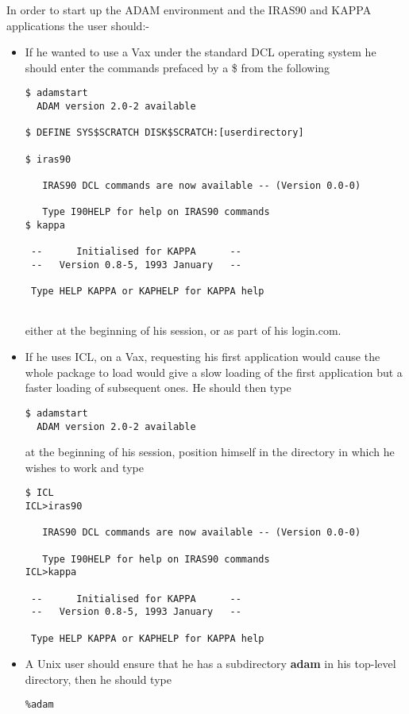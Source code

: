 In order to start up the ADAM environment and the IRAS90 and KAPPA applications
the user should:-
\begin{itemize}
\item If he wanted to use a Vax under the standard DCL operating system  he 
should enter the commands prefaced by a \$ from the following
\begin{small}
\begin{verbatim}
$ adamstart
  ADAM version 2.0-2 available

$ DEFINE SYS$SCRATCH DISK$SCRATCH:[userdirectory]

$ iras90
 
   IRAS90 DCL commands are now available -- (Version 0.0-0)
 
   Type I90HELP for help on IRAS90 commands
$ kappa
 
 --      Initialised for KAPPA      -- 
 --   Version 0.8-5, 1993 January   -- 
 
 Type HELP KAPPA or KAPHELP for KAPPA help   
 
\end{verbatim}
\end{small}
either at the beginning of his session, or as part of his login.com.
\item If he uses ICL, on a Vax, requesting his first application would cause the
whole package to load would give a slow loading of the first application but a
faster loading of subsequent ones. He should then type
\begin{small}
\begin{verbatim}
$ adamstart
  ADAM version 2.0-2 available
\end{verbatim}
\end{small}
at the beginning of his session, position himself in the directory in which he 
wishes to work and type
\begin{small}
\begin{verbatim}
$ ICL
ICL>iras90
 
   IRAS90 DCL commands are now available -- (Version 0.0-0)
 
   Type I90HELP for help on IRAS90 commands
ICL>kappa
 
 --      Initialised for KAPPA      -- 
 --   Version 0.8-5, 1993 January   -- 
 
 Type HELP KAPPA or KAPHELP for KAPPA help   
\end{verbatim}
\end{small}
\item A Unix user should ensure that he has a subdirectory {\bf adam} in his
top-level directory, then he should type
\begin{small}
\begin{verbatim}
%adam


\end{verbatim}
\end{small}
\end{itemize}
